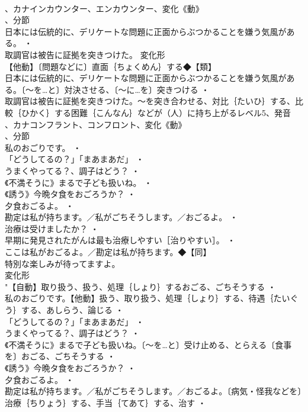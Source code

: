 \documentclass[8pt]{extreport}
\begin{document}
\begin{CJK}{UTF8}{min}
\\	、カナインカウンター、エンカウンター、変化《動》
\\	、分節
\\	日本には伝統的に、デリケートな問題に正面からぶつかることを嫌う気風がある。 ・
\\	取調官は被告に証拠を突きつけた。	変化形 
\\	【他動】〔問題などに〕直面｛ちょくめん｝する◆【類】
\\	日本には伝統的に、デリケートな問題に正面からぶつかることを嫌う気風がある。〔～を…と〕対決させる、〔～に…を〕突きつける ・
\\	取調官は被告に証拠を突きつけた。～を突き合わせる、対比｛たいひ｝する、比較｛ひかく｝する困難｛こんなん｝などが（人）に持ち上がるレベル5、発音
\\	、カナコンフラント、コンフロント、変化《動》
\\	、分節
\\	私のおごりです。 ・
\\	「どうしてるの？」「まあまあだ」 ・
\\	うまくやってる？、調子はどう？ ・
\\	《不満そうに》まるで子ども扱いね。 ・
\\	《誘う》今晩タ食をおごろうか？ ・
\\	夕食おごるよ。 ・
\\	勘定は私が持ちます。／私がごちそうします。／おごるよ。 ・
\\	治療は受けましたか？ ・
\\	早期に発見されたがんは最も治療しやすい［治りやすい］。 ・
\\	ここは私がおごるよ。／勘定は私が持ちます。◆【同】
\\	特別な楽しみが待ってますよ。
\\	変化形 
\\	"【自動】取り扱う、扱う、処理｛しょり｝するおごる、ごちそうする ・
\\	私のおごりです。【他動】扱う、取り扱う、処理｛しょり｝する、待遇｛たいぐう｝する、あしらう、論じる ・
\\	「どうしてるの？」「まあまあだ」 ・
\\	うまくやってる？、調子はどう？ ・
\\	《不満そうに》まるで子ども扱いね。〔～を…と〕受け止める、とらえる〔食事を〕おごる、ごちそうする ・
\\	《誘う》今晩タ食をおごろうか？ ・
\\	夕食おごるよ。 ・
\\	勘定は私が持ちます。／私がごちそうします。／おごるよ。〔病気・怪我などを〕治療｛ちりょう｝する、手当｛てあて｝する、治す ・

\end{CJK}
\end{document}
